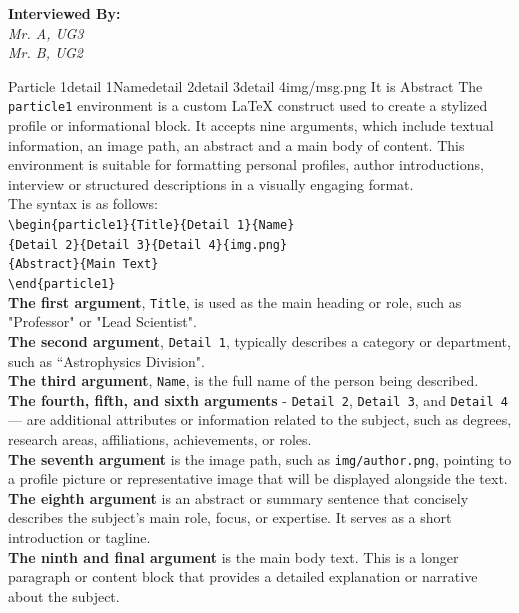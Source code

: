 \documentclass[10pt,twoside]{article}
\begin{document}
{{	  	\begin{flushright}
	  		\large{\textbf{Interviewed By:}}\\
	  		\textcolor{mt}{\textit{Mr. A, UG3}}\\
	  		\textcolor{mt}{\textit{Mr. B, UG2}}
	  	\end{flushright}
  	}
  	

  
  	\begin{particle1}{Particle 1}{detail 1}{Name}{detail 2}{detail 3}{detail 4}{img/msg.png}
  	{It is Abstract}  	
  	{\lettrine{T}{}he \texttt{particle1} environment is a custom LaTeX construct used to create a stylized profile or informational block. It accepts nine arguments, which include textual information, an image path, an abstract and a main body of content. This environment is suitable for formatting personal profiles, author introductions, interview or structured descriptions in a visually engaging format.\\
  	The syntax is as follows:\\
  	\texttt{\textbackslash begin\{particle1\}\{Title\}\{Detail 1\}\{Name\}\\\{Detail 2\}\{Detail 3\}\{Detail 4\}\{img.png\}\\\{Abstract\}\{Main Text\}\\\textbackslash end\{particle1\}}\\
  	\bullet \textbf{The first argument}, \texttt{Title}, is used as the main heading or role, such as "Professor" or "Lead Scientist".\\
  	\bullet \textbf{The second argument}, \texttt{Detail 1}, typically describes a category or department, such as ``Astrophysics Division".\\
  	\bullet \textbf{The third argument}, \texttt{Name}, is the full name of the person being described.\\  	
  	\bullet \textbf{ The fourth, fifth, and sixth arguments} - \texttt{Detail 2}, \texttt{Detail 3}, and \texttt{Detail 4} — are additional attributes or information related to the subject, such as degrees, research areas, affiliations, achievements, or roles.\\  	
  	\bullet \textbf{The seventh argument} is the image path, such as \texttt{img/author.png}, pointing to a profile picture or representative image that will be displayed alongside the text.\\  	
  	\bullet \textbf{The eighth argument} is an abstract or summary sentence that concisely describes the subject's main role, focus, or expertise. It serves as a short introduction or tagline.\\  	
  	\bullet \textbf{The ninth and final argument} is the main body text. This is a longer paragraph or content block that provides a detailed explanation or narrative about the subject.}  		
  	\end{particle1}
  	
}
\end{document}
